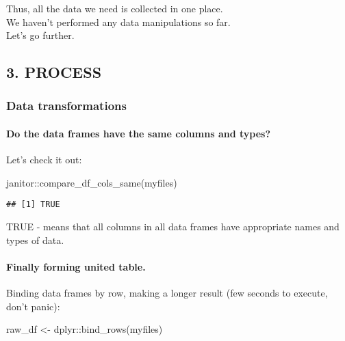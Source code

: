\documentclass[
]{article}
\newenvironment{Shaded}{\begin{snugshade}}{\end{snugshade}}
\newcommand{\FunctionTok}[1]{\textcolor[rgb]{0.00,0.00,0.00}{#1}}
\newcommand{\NormalTok}[1]{#1}
\newcommand{\OtherTok}[1]{\textcolor[rgb]{0.56,0.35,0.01}{#1}}
\newcommand{\SpecialCharTok}[1]{\textcolor[rgb]{0.00,0.00,0.00}{#1}}
\begin{document}
Thus, all the data we need is collected in one place.\\

We haven't performed any data manipulations so far.\\

Let's go further.

\hypertarget{process}{%
\subsection{3. PROCESS}\label{process}}

\hypertarget{data-transformations}{%
\subsubsection{Data transformations}\label{data-transformations}}

\hypertarget{do-the-data-frames-have-the-same-columns-and-types}{%
\paragraph{Do the data frames have the same columns and
types?}\label{do-the-data-frames-have-the-same-columns-and-types}}

Let's check it out:

\begin{Shaded}
\begin{Highlighting}[]
\NormalTok{janitor}\SpecialCharTok{::}\FunctionTok{compare\_df\_cols\_same}\NormalTok{(myfiles)}
\end{Highlighting}
\end{Shaded}

\begin{verbatim}
## [1] TRUE
\end{verbatim}

TRUE - means that all columns in all data frames have appropriate names
and types of data.

\hypertarget{finally-forming-united-table.}{%
\paragraph{Finally forming united
table.}\label{finally-forming-united-table.}}

Binding data frames by row, making a longer result (few seconds to
execute, don't panic):

\begin{Shaded}
\begin{Highlighting}[]
\NormalTok{raw\_df }\OtherTok{\textless{}{-}}\NormalTok{ dplyr}\SpecialCharTok{::}\FunctionTok{bind\_rows}\NormalTok{(myfiles)}
\end{Highlighting}
\end{Shaded}
\end{document}
